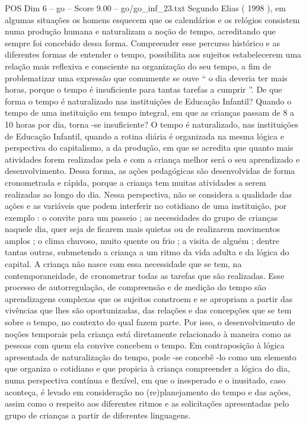 \begin{textsample}{POS Dim 6 – go – Score 9.00 – go/go\_inf\_23.txt}
Segundo Elias ( 1998 ), em algumas situações os homens esquecem que os calendários e os relógios consistem numa produção humana e naturalizam a noção de tempo, acreditando que sempre foi concebido dessa forma.
Compreender esse percurso histórico e as diferentes formas de entender o tempo, possibilita aos sujeitos estabelecerem uma relação mais reflexiva e consciente na organização do seu tempo, a fim de problematizar uma expressão que comumente se ouve “ o dia deveria ter mais horas, porque o tempo é insuficiente para tantas tarefas a cumprir ”.
De que forma o tempo é naturalizado nas instituições de Educação Infantil?
Quando o tempo de uma instituição em tempo integral, em que as crianças passam de 8 a 10 horas por dia, torna -se insuficiente?
O tempo é naturalizado, nas instituições de Educação Infantil, quando a rotina diária é organizada na mesma lógica e perspectiva do capitalismo, a da produção, em que se acredita que quanto mais atividades forem realizadas pela e com a criança melhor será o seu aprendizado e desenvolvimento.
Dessa forma, as ações pedagógicas são desenvolvidas de forma cronometrada e rápida, porque a criança tem muitas atividades a serem realizadas ao longo do dia.
Nessa perspectiva, não se considera a qualidade das ações e as variáveis que podem interferir no cotidiano de uma instituição, por exemplo : o convite para um passeio ; as necessidades do grupo de crianças naquele dia, quer seja de ficarem mais quietas ou de realizarem movimentos amplos ; o clima chuvoso, muito quente ou frio ; a visita de alguém ; dentre tantas outras, submetendo a criança a um ritmo da vida adulta e da lógica do capital.
A criança não nasce com essa necessidade que se tem, na contemporaneidade, de cronometrar todas as tarefas que são realizadas.
Esse processo de autorregulação, de compreensão e de medição do tempo são aprendizagens complexas que os sujeitos constroem e se apropriam a partir das vivências que lhes são oportunizadas, das relações e das concepções que se tem sobre o tempo, no contexto do qual fazem parte.
Por isso, o desenvolvimento de noções temporais pela criança está diretamente relacionado à maneira como as pessoas com quem ela convive concebem o tempo.
Em contraposição à lógica apresentada de naturalização do tempo, pode -se concebê -lo como um elemento que organiza o cotidiano e que propicia à criança compreender a lógica do dia, numa perspectiva contínua e flexível, em que o inesperado e o inusitado, caso aconteça, é levado em consideração no (re)planejamento do tempo e das ações, assim como o respeito aos diferentes ritmos e as solicitações apresentadas pelo grupo de crianças a partir de diferentes linguagens.

\end{textsample}
